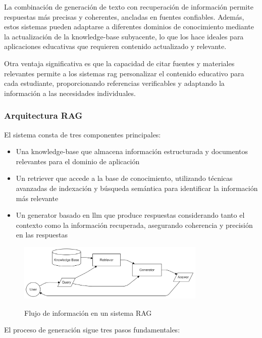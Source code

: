 La combinación de generación de texto con recuperación de información permite respuestas más precisas y coherentes, ancladas en fuentes confiables. Además, estos sistemas pueden adaptarse a diferentes dominios de conocimiento mediante la actualización de la \gls{knowledge-base} subyacente, lo que los hace ideales para aplicaciones educativas que requieren contenido actualizado y relevante.

Otra ventaja significativa es que la capacidad de citar fuentes y materiales relevantes permite a los sistemas \gls{rag} personalizar el contenido educativo para cada estudiante, proporcionando referencias verificables y adaptando la información a las necesidades individuales.

\subsubsection{Arquitectura RAG}

El sistema consta de tres componentes principales:

\begin{itemize}
  \item Una \gls{knowledge-base} que almacena información estructurada y documentos relevantes para el dominio de aplicación

  \item Un \gls{retriever} que accede a la base de conocimiento, utilizando técnicas avanzadas de indexación y búsqueda semántica para identificar la información más relevante

  \item Un \gls{generator} basado en \gls{llm} que produce respuestas considerando tanto el contexto como la información recuperada, asegurando coherencia y precisión en las respuestas
\end{itemize}

\begin{figure}[h]
  \centering
  \includegraphics[width=0.8\textwidth]{figuras/rag-flow.png}
  \label{fig:rag-flow}
  \caption{Flujo de información en un sistema RAG}
\end{figure}

El proceso de generación sigue tres pasos fundamentales:

